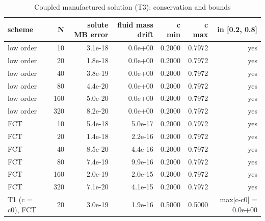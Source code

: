 \begin{table}[h]
\centering
\caption{Coupled manufactured solution (T3): conservation and bounds}
\begin{tabular}{lrrrrrr}
\hline
scheme & N & solute MB error & fluid mass drift & c min & c max & in [0.2, 0.8] \\
\hline
low order & 10 & 3.1e-18 & 0.0e+00 & 0.2000 & 0.7972 & yes \\
low order & 20 & 1.8e-18 & 0.0e+00 & 0.2000 & 0.7972 & yes \\
low order & 40 & 3.8e-19 & 0.0e+00 & 0.2000 & 0.7972 & yes \\
low order & 80 & 4.4e-20 & 0.0e+00 & 0.2000 & 0.7972 & yes \\
low order & 160 & 5.0e-20 & 0.0e+00 & 0.2000 & 0.7972 & yes \\
low order & 320 & 8.2e-20 & 0.0e+00 & 0.2000 & 0.7972 & yes \\
FCT & 10 & 5.4e-18 & 5.0e-17 & 0.2000 & 0.7972 & yes \\
FCT & 20 & 1.4e-18 & 2.2e-16 & 0.2000 & 0.7972 & yes \\
FCT & 40 & 8.5e-20 & 4.4e-16 & 0.2000 & 0.7972 & yes \\
FCT & 80 & 7.4e-19 & 9.9e-16 & 0.2000 & 0.7972 & yes \\
FCT & 160 & 2.0e-19 & 2.0e-15 & 0.2000 & 0.7972 & yes \\
FCT & 320 & 7.1e-20 & 4.1e-15 & 0.2000 & 0.7972 & yes \\
T1 (c = c0), FCT & 20 & 3.0e-19 & 1.9e-16 & 0.5000 & 0.5000 & max|c-c0| = 0.0e+00 \\
\hline
\end{tabular}
\end{table}

